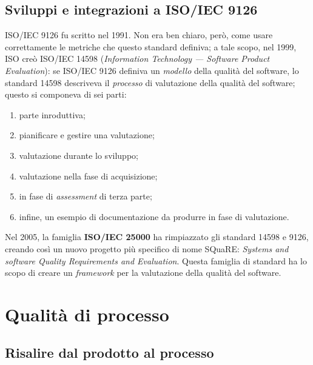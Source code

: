 \documentclass[a4paper]{article}
\begin{document}
		
	\subsection{Sviluppi e integrazioni a ISO/IEC 9126}

		
ISO/IEC 9126 fu scritto nel 1991. Non era ben chiaro, però, come usare correttamente le metriche che questo standard definiva; a tale scopo, nel 1999, ISO creò ISO/IEC 14598 (\emph{Information Technology --- Software Product Evaluation}): se ISO/IEC 9126 definiva un \emph{modello} della qualità del software, lo standard 14598 descriveva il \emph{processo} di valutazione della qualità del software; questo si componeva di sei parti:
		
	\begin{enumerate}
		
			
	\item parte inroduttiva;
			
	\item pianificare e gestire una valutazione;
			
	\item valutazione durante lo sviluppo;
			
	\item valutazione nella fase di acquisizione; 
			
	\item in fase di \emph{assessment} di terza parte;
			
	\item infine, un esempio di documentazione da produrre in fase di valutazione.
		
	\end{enumerate}

		
Nel 2005, la famiglia \textbf{ISO/IEC 25000} ha rimpiazzato gli standard 14598 e 9126, creando così un nuovo progetto più specifico di nome SQuaRE: \emph{Systems and software Quality Requirements and Evaluation}. Questa famiglia di standard ha lo scopo di creare un \emph{framework} per la valutazione della qualità del software.%

	


		
	\section{Qualità di processo}


		
	\subsection{Risalire dal prodotto al processo}
\end{document}
